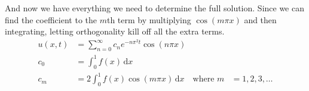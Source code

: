 \documentclass{article}
\begin{document}
And now we have everything we need to determine the full solution. Since we can find the coefficient to the $m$th term by multiplying $\cos(m\pi x)$ and then integrating, letting orthogonality kill off all the extra terms.
\begin{align*}
  u(x,t)&=\sum\limits_{n=0}^\infty{c_ne^{-n\pi^2t}\cos(n\pi x)}\\
  c_0&=\int_0^1{f(x)\,\mathrm{d}x}\\
  c_m&=2\int_{0}^1{f(x)\cos(m\pi x)\,\mathrm{d}x}&\text{where }m&=1,2,3,\dots
\end{align*}
\end{document}
